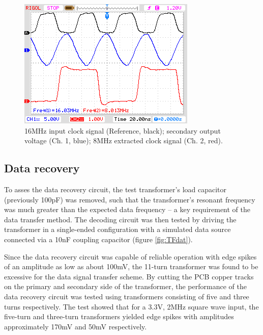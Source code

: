 \documentclass[conference]{IEEEtran}
\begin{document}
	\begin{figure}[t]
		\centering
		\includegraphics[width=0.8\columnwidth]{./img/Clock}
		\caption{16MHz input clock signal (Reference, black); secondary output voltage (Ch. 1, blue); 8MHz extracted clock signal (Ch. 2, red).}
		\label{fig:Clock}
	\end{figure}
	
	\subsection{Data recovery}
	To asses the data recovery circuit, the test transformer's load capacitor (previously 100pF) was removed, such that the transformer's resonant frequency was much greater than the expected data frequency -- a key requirement of the data transfer method.  The decoding circuit was then tested by driving the transformer in a single-ended configuration with a simulated data source connected via a 10nF coupling capacitor (figure \ref{fig:TFdat}).
	
	Since the data recovery circuit was capable of reliable operation with edge spikes of an amplitude as low as about 100mV, the 11-turn transformer was found to be excessive for the data signal transfer scheme.  By cutting the PCB copper tracks on the primary and secondary side of the transformer, the performance of the data recovery circuit was tested using transformers consisting of five and three turns respectively.  The test showed that for a 3.3V, 2MHz square wave input, the five-turn and three-turn transformers yielded edge spikes with amplitudes approximately 170mV and 50mV respectively.
	
\end{document}
